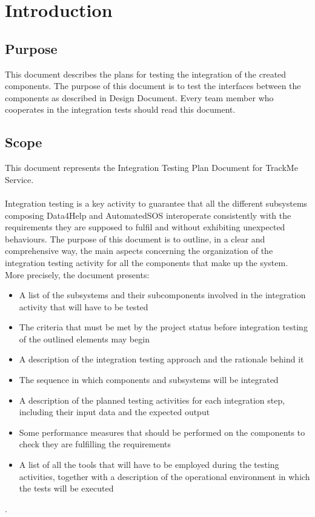 \documentclass[a4paper, hidelinks, 12pt]{report}
\begin{document}
	\chapter{Introduction}
	\section{Purpose}
	This document describes the plans for testing the integration of the created components. The purpose of this document is to test the interfaces between the components as described in
Design Document. Every team member who cooperates in the integration tests should read this document.
	\section{Scope}
	This document represents the Integration Testing Plan Document for TrackMe Service. \\\\
	Integration testing is a key activity to guarantee that all the different subsystems composing Data4Help and AutomatedSOS interoperate consistently with the requirements they are supposed to fulfil and without exhibiting unexpected behaviours. The purpose of this document is to outline, in a clear and comprehensive way, the main aspects concerning the organization of the integration testing activity for all the components that make up the system.	\\	
	More precisely, the document presents:
	
\begin{itemize}
		\item{}A list of the subsystems and their subcomponents involved in the integration activity that will have to be tested
		\item{}The criteria that must be met by the project status before integration testing of the outlined elements may begin
		\item{}A description of the integration testing approach and the rationale behind it
		\item{}The sequence in which components and subsystems will be integrated
		\item{} A description of the planned testing activities for each integration step, including their input data and the expected output
		\item{}Some performance measures that should be performed on the components to check they are fulfilling the requirements
		\item{}A list of all the tools that will have to be employed during the testing activities, together with a description of the operational environment in which the tests will be executed
	\end{itemize}.
	
\end{document}
